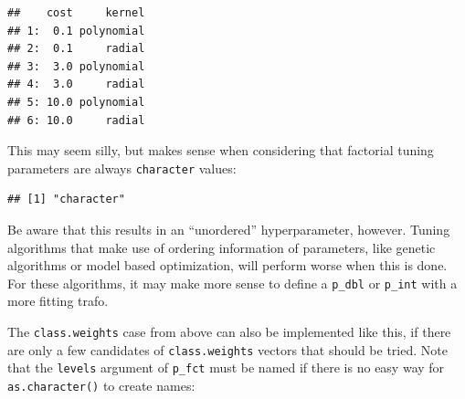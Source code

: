 \documentclass[
]{scrbook}
\newenvironment{Shaded}{\begin{snugshade}}{\end{snugshade}}
\newcommand{\AttributeTok}[1]{\textcolor[rgb]{0.77,0.63,0.00}{#1}}
\newcommand{\DecValTok}[1]{\textcolor[rgb]{0.00,0.00,0.81}{#1}}
\newcommand{\FloatTok}[1]{\textcolor[rgb]{0.00,0.00,0.81}{#1}}
\newcommand{\FunctionTok}[1]{\textcolor[rgb]{0.00,0.00,0.00}{#1}}
\newcommand{\NormalTok}[1]{#1}
\newcommand{\OtherTok}[1]{\textcolor[rgb]{0.56,0.35,0.01}{#1}}
\newcommand{\SpecialCharTok}[1]{\textcolor[rgb]{0.00,0.00,0.00}{#1}}
\newcommand{\StringTok}[1]{\textcolor[rgb]{0.31,0.60,0.02}{#1}}
\renewenvironment{Shaded} {\begin{snugshade}\small} {\end{snugshade}}
\begin{document}
\begin{verbatim}
##    cost     kernel
## 1:  0.1 polynomial
## 2:  0.1     radial
## 3:  3.0 polynomial
## 4:  3.0     radial
## 5: 10.0 polynomial
## 6: 10.0     radial
\end{verbatim}

This may seem silly, but makes sense when considering that factorial tuning parameters are always \texttt{character} values:

\begin{Shaded}
\end{Shaded}

\begin{verbatim}
## [1] "character"
\end{verbatim}

Be aware that this results in an ``unordered'' hyperparameter, however.
Tuning algorithms that make use of ordering information of parameters, like genetic algorithms or model based optimization, will perform worse when this is done.
For these algorithms, it may make more sense to define a \texttt{p\_dbl} or \texttt{p\_int} with a more fitting trafo.

The \texttt{class.weights} case from above can also be implemented like this, if there are only a few candidates of \texttt{class.weights} vectors that should be tried.
Note that the \texttt{levels} argument of \texttt{p\_fct} must be named if there is no easy way for \texttt{as.character()} to create names:

\begin{Shaded}
\end{Shaded}
\end{document}
